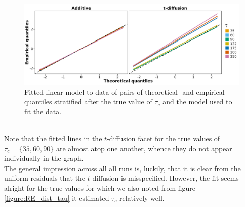 \begin{figure}[h!]
    \begin{center}
        \includegraphics[scale = .075]{figures/quantiles_plot_tau.jpeg}
        \caption{Fitted linear model to data of pairs of theoretical- and empirical quantiles stratified after the true value of $\tau_c$ and the model used to fit the data.}
        \label{figure:QQ_plot_tau}
    \end{center}
\end{figure}\\
Note that the fitted lines in the $t$-diffusion facet for the true values of $\tau_c = \{35, 60, 90\}$ are almost atop one another, whence they do not appear individually in the graph. \\
The general impression across all all runs is, luckily, that it is clear from the uniform residuals that the $t$-diffusion is misspecified. However, the fit seems alright for the true values for which we also noted from figure \ref{figure:RE_dist_tau} it estimated $\tau_c$ relatively well. 